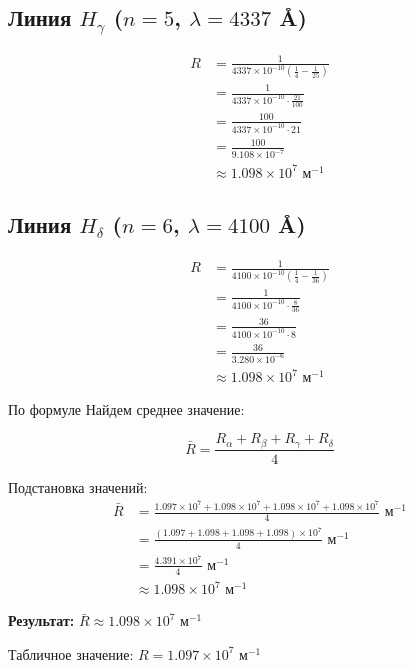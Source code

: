 \documentclass[a4paper]{article}
\begin{document}
\subsection*{Линия $H_\gamma$ ($n=5$, $\lambda = 4337$ \AA)}
\begin{align}
R &= \frac{1}{4337 \times 10^{-10} \left(\frac{1}{4} - \frac{1}{25}\right)} \\
&= \frac{1}{4337 \times 10^{-10} \cdot \frac{21}{100}} \\
&= \frac{100}{4337 \times 10^{-10} \cdot 21} \\
&= \frac{100}{9.108 \times 10^{-7}} \\
&\approx 1.098 \times 10^7 \text{ м}^{-1}
\end{align}

\subsection*{Линия $H_\delta$ ($n=6$, $\lambda = 4100$ \AA)}
\begin{align}
R &= \frac{1}{4100 \times 10^{-10} \left(\frac{1}{4} - \frac{1}{36}\right)} \\
&= \frac{1}{4100 \times 10^{-10} \cdot \frac{8}{36}} \\
&= \frac{36}{4100 \times 10^{-10} \cdot 8} \\
&= \frac{36}{3.280 \times 10^{-6}} \\
&\approx 1.098 \times 10^7 \text{ м}^{-1}
\end{align}

По формуле Найдем среднее значение:

\begin{equation}
\bar{R} = \frac{R_\alpha + R_\beta + R_\gamma + R_\delta}{4}
\end{equation}

Подстановка значений:
\begin{align}
\bar{R} &= \frac{1.097 \times 10^7 + 1.098 \times 10^7 + 1.098 \times 10^7 + 1.098 \times 10^7}{4} \text{ м}^{-1} \\[10pt]
&= \frac{(1.097 + 1.098 + 1.098 + 1.098) \times 10^7}{4} \text{ м}^{-1} \\[10pt]
&= \frac{4.391 \times 10^7}{4} \text{ м}^{-1} \\[10pt]
&\approx 1.098 \times 10^7 \text{ м}^{-1}
\end{align}

\textbf{Результат:} $\bar{R} \approx 1.098 \times 10^7$ м$^{-1}$

Табличное значение: $R = 1.097 \times 10^7$ м$^{-1}$
\end{document}

